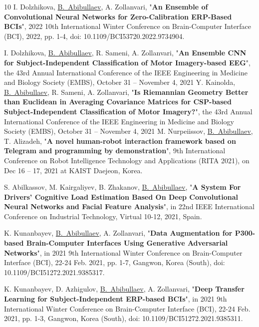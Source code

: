 \documentclass[10pt,letterpaper,sans]{moderncv}   %
\begin{document}
\vspace{0.2cm}

    
\renewcommand{\refname}{Conference proceedings}
\begin{thebibliography}{10}
\small
I. Dolzhikova, \underline{B.~Abibullaev}, A. Zollanvari, "\textbf{An Ensemble of Convolutional Neural Networks for Zero-Calibration ERP-Based BCIs}", 2022 10th International Winter Conference on Brain-Computer Interface (BCI), 2022, pp. 1-4, doi: 10.1109/BCI53720.2022.9734904.
  
\small
I. Dolzhikova, \underline{B.~Abibullaev}, R. Sameni, A. Zollanvari, "\textbf{An Ensemble CNN for Subject-Independent Classification of Motor Imagery-based EEG}", the 43rd Annual International Conference of the IEEE Engineering in Medicine and Biology Society (EMBS), October 31 – November 4, 2021
\small
Y. Kainolda, \underline{B.~Abibullaev}, R. Sameni, A. Zollanvari, "\textbf{Is Riemannian Geometry Better than Euclidean in Averaging Covariance Matrices for CSP-based Subject-Independent Classification of Motor Imagery?}", the 43rd Annual International Conference of the IEEE Engineering in Medicine and Biology Society (EMBS), October 31 – November 4, 2021
\small
M. Nurpeiissov, \underline{B.~Abibullaev}, T. Alizadeh,  "\textbf{A novel human-robot interaction framework based on Telegram and programming by demonstration}", 9th International Conference on Robot Intelligence Technology and Applications (RITA 2021), on Dec 16 -- 17, 2021 at KAIST Daejeon, Korea.
    
\small
S. Abilkassov, M. Kairgaliyev, B. Zhakanov, \underline{B.~Abibullaev}, 
"\textbf{A System For Drivers' Cognitive Load Estimation Based On Deep Convolutional Neural Networks and Facial Feature Analysis}", in 22nd IEEE International Conference on Industrial Technology, Virtual 10-12, 2021, Spain.

\small
K. Kunanbayev, \underline{B.~Abibullaev}, A. Zollanvari, "\textbf{Data Augmentation for P300-based Brain-Computer Interfaces Using Generative Adversarial Networks}", in 2021 9th International Winter Conference on Brain-Computer Interface (BCI), 22-24 Feb. 2021, pp. 1-7, Gangwon, Korea (South), doi: 10.1109/BCI51272.2021.9385317.

\small
K. Kunanbayev, D. Azhigulov,  \underline{B.~Abibullaev}, A. Zollanvari, "\textbf{Deep Transfer Learning for Subject-Independent ERP-based BCIs}", in 2021 9th International Winter Conference on Brain-Computer Interface (BCI), 22-24 Feb. 2021, pp. 1-3,  Gangwon, Korea (South), doi: 10.1109/BCI51272.2021.9385311.


\end{thebibliography}
\end{document}
